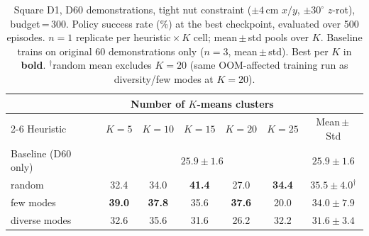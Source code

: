 
\begin{table}[t]
  \centering
  \caption{Square D1, D60 demonstrations, tight nut constraint
  ($\pm4$\,cm $x/y$, $\pm30^{\circ}$ $z$-rot), budget\,=\,300.
  Policy success rate (\%) at the best checkpoint, evaluated over 500 episodes.
  $n{=}1$ replicate per heuristic\,$\times$\,$K$ cell; mean\,$\pm$\,std pools over $K$.
  Baseline trains on original 60 demonstrations only ($n{=}3$, mean\,$\pm$\,std).
  Best per $K$ in \textbf{bold}.
  $^\dagger$random mean excludes $K{=}20$ (same OOM-affected training run as diversity/few modes at $K{=}20$).}
  \label{tab:k_sweep_tight}
  \setlength{\tabcolsep}{5pt}
  \begin{tabular}{lcccccc}
  \toprule
  & \multicolumn{5}{c}{Number of $K$-means clusters} & \\
  \cmidrule(lr){2-6}
  Heuristic & $K{=}5$ & $K{=}10$ & $K{=}15$ & $K{=}20$ & $K{=}25$ & Mean\,$\pm$\,Std \\
  \midrule
  Baseline (D60 only) & \multicolumn{5}{c}{$25.9 \pm 1.6$} & $25.9 \pm 1.6$ \\
  \midrule
  random        & 32.4          & 34.0          & \textbf{41.4} & 27.0          & \textbf{34.4} & $35.5 \pm 4.0^\dagger$ \\
  few modes     & \textbf{39.0} & \textbf{37.8} & 35.6          & \textbf{37.6} & 20.0          & $34.0 \pm 7.9$ \\
  diverse modes & 32.6          & 35.6          & 31.6          & 26.2          & 32.2          & $31.6 \pm 3.4$ \\
  \bottomrule
  \end{tabular}
\end{table}
